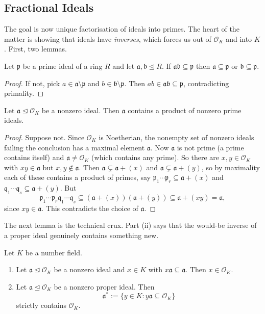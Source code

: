 \documentclass[a4paper]{scrartcl}
\renewcommand{\OO}{\mathcal{O}}
\newcommand{\fa}{\mathfrak{a}}
\newcommand{\fb}{\mathfrak{b}}
\newcommand{\fp}{\mathfrak{p}}
\newcommand{\fq}{\mathfrak{q}}
\begin{document}
\subsection{Fractional Ideals}

The goal is now unique factorisation of ideals into primes. The heart of the matter is showing that ideals have \emph{inverses}, which forces us out of $\OO_K$ and into $K$. First, two lemmas.

\begin{lemma}\label{lem:primecontain}
	Let $\fp$ be a prime ideal of a ring $R$ and let $\fa, \fb \trianglelefteq R$. If $\fa\fb \subseteq \fp$ then $\fa \subseteq \fp$ or $\fb \subseteq \fp$.
\end{lemma}

\begin{proof}
	If not, pick $a \in \fa\setminus\fp$ and $b \in \fb\setminus\fp$. Then $ab \in \fa\fb \subseteq \fp$, contradicting primality.
\end{proof}

\begin{lemma}\label{lem:containsprod}
	Let $\fa \trianglelefteq \OO_K$ be a nonzero ideal. Then $\fa$ contains a product of nonzero prime ideals.
\end{lemma}

\begin{proof}
	Suppose not. Since $\OO_K$ is Noetherian, the nonempty set of nonzero ideals failing the conclusion has a maximal element $\fa$. Now $\fa$ is not prime (a prime contains itself) and $\fa \neq \OO_K$ (which contains any prime). So there are $x, y \in \OO_K$ with $xy \in \fa$ but $x, y \notin \fa$. Then $\fa \subsetneq \fa + (x)$ and $\fa \subsetneq \fa + (y)$, so by maximality each of these contains a product of primes, say $\fp_1\cdots\fp_r \subseteq \fa + (x)$ and $\fq_1\cdots\fq_s \subseteq \fa+(y)$. But
	$$\fp_1\cdots\fp_r\fq_1\cdots\fq_s \subseteq (\fa+(x))(\fa+(y)) \subseteq \fa + (xy) = \fa,$$
	since $xy \in \fa$. This contradicts the choice of $\fa$.
\end{proof}

The next lemma is the technical crux. Part (ii) says that the would-be inverse of a proper ideal genuinely contains something new.

\begin{lemma}\label{lem:crux}
	Let $K$ be a number field.
	\begin{enumerate}[label=(\roman*)]
		\item Let $\fa \trianglelefteq \OO_K$ be a nonzero ideal and $x \in K$ with $x\fa \subseteq \fa$. Then $x \in \OO_K$.
		\item Let $\fa \trianglelefteq \OO_K$ be a nonzero proper ideal. Then
		$$\fa^* := \{y \in K : y\fa \subseteq \OO_K\}$$
		strictly contains $\OO_K$.
	\end{enumerate}
\end{lemma}
\end{document}
